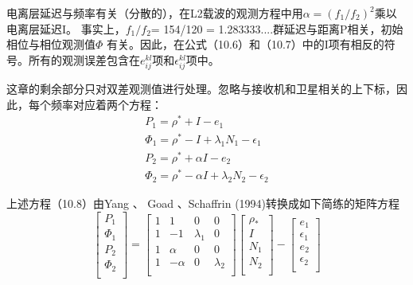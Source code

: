 电离层延迟与频率有关（分散的），在L2载波的观测方程中用$\alpha=(f_{1}/f_{2})^{2}$乘以电离层延迟I。 事实上，$f_{1}/f_{2}$= 154/120 = 1.283333....群延迟与距离P相关，初始相位与相位观测值$\Phi$ 有关。因此，在公式（10.6）和（10.7）中的I项有相反的符号。所有的观测误差包含在$e_{ij}^{kl}$项和$\epsilon_{ij}^{kl}$项中。

这章的剩余部分只对双差观测值进行处理。忽略与接收机和卫星相关的上下标，因此，每个频率对应着两个方程：
\begin{equation}
	\begin{split}
		P_{1}=\rho^{*}+I-e_{1}\\
		\Phi_{1}=\rho^{*}-I+\lambda_{1}N_{1}-\epsilon_{1}\\
		P_{2}=\rho^{*}+\alpha I-e_{2}\\
		\Phi_{2}=\rho^{*}-\alpha I+\lambda_{2}N_{2}-\epsilon_{2}
	\end{split}
\end{equation}

上述方程（10.8）由Yang 、 Goad 、Schaffrin (1994)转换成如下简练的矩阵方程
\begin{equation}
	\begin{bmatrix}
		P_{1}\\
		\Phi_{1}\\
		P_{2}\\
		\Phi_{2}\\
	\end{bmatrix}
	=\begin{bmatrix}
		1 & 1 & 0 & 0\\
		1 & -1 & \lambda_{1} & 0\\
		1 & \alpha & 0 & 0\\
		1 & -\alpha & 0 & \lambda_{2}\\
	\end{bmatrix}
	\begin{bmatrix}
		\rho_{*}\\
		I\\
		N_{1}\\
		N_{2}\\
	\end{bmatrix}
	-
	\begin{bmatrix}
		e_{1}\\
		\epsilon_{1}\\
		e_{2}\\
		\epsilon_{2}\\
	\end{bmatrix}
\end{equation}

